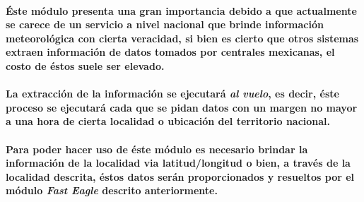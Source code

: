     \paragraph{Éste módulo presenta una gran importancia debido a que actualmente se carece de un servicio a nivel nacional que brinde información meteorológica con cierta veracidad, si bien es cierto que otros sistemas extraen información de datos tomados por centrales mexicanas, el costo de éstos suele ser elevado.}
    \paragraph{La extracción de la información se ejecutará \emph{al vuelo}, es decir, éste proceso se ejecutará cada que se pidan datos con un margen no mayor a una hora de cierta localidad o ubicación del territorio nacional.}
    \paragraph{Para poder hacer uso de éste módulo es necesario brindar la información de la localidad via latitud/longitud o bien, a través de la localidad descrita, éstos datos serán proporcionados y resueltos por el módulo \textbf{\emph{Fast Eagle}} descrito anteriormente.}
